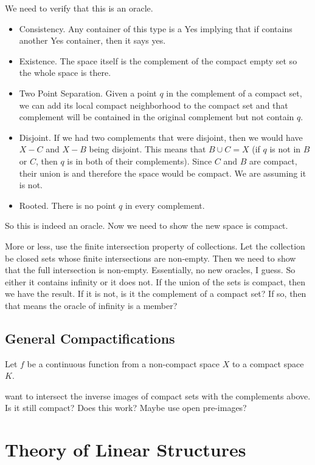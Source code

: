 \documentclass[12pt]{article}
\begin{document}
We need to verify that this is an oracle.  
\begin{itemize}
    \item Consistency. Any container of this type is a Yes implying that if contains another Yes container, then it says yes. 
    \item Existence. The space itself is the complement of the compact empty set so the whole space is there. 
    \item Two Point Separation. Given a point $q$ in the complement of a compact set, we can add its local compact neighborhood to the compact set and that complement will be contained in the original complement but not contain $q$. 
    \item Disjoint. If we had two complements that were disjoint, then we would have $X-C$ and $X-B$ being disjoint. This means that $B \cup C = X$ (if $q$ is not in $B$ or $C$, then $q$ is in both of their complements). Since $C$ and $B$ are compact, their union is and therefore the space would be compact. We are assuming it is not.
    \item Rooted. There is no point $q$ in every complement. 
\end{itemize}

So this is indeed an oracle. Now we need to show the new space is compact. 

More or less, use the finite intersection property of collections. Let the collection be closed sets whose finite intersections are non-empty. Then we need to show that the full intersection is non-empty. Essentially, no new oracles, I guess. So either it contains infinity or it does not. If the union of the sets is compact, then we have the result. If it is not, is it the complement of a compact set? If so, then that means the oracle of infinity is a member? 

\subsection{General Compactifications}

Let $f$ be a continuous function from a non-compact space $X$ to a compact space $K$. 

want to intersect the inverse images of compact sets with the complements above. Is it still compact? Does this work? Maybe use open pre-images? 

\section{Theory of Linear Structures}
\end{document}
